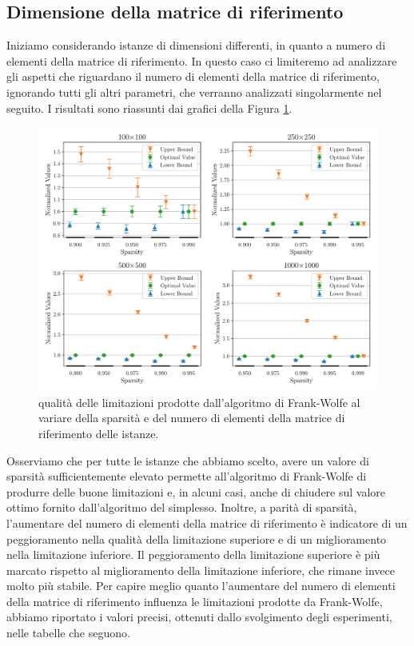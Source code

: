 \subsection{Dimensione della matrice di riferimento}
Iniziamo considerando istanze di dimensioni differenti, in quanto a numero di elementi della matrice di riferimento. In
questo caso ci limiteremo ad analizzare gli aspetti che riguardano il numero di elementi della matrice di riferimento,
ignorando tutti gli altri parametri, che verranno analizzati singolarmente nel seguito. I risultati sono riassunti dai
grafici della Figura \ref{fig:bysize}.
\begin{figure}[ht]
    \centering
    \includegraphics[width=\textwidth]{assets/figures/size.pdf}
    \caption{qualità delle limitazioni prodotte dall'algoritmo di Frank-Wolfe al variare della sparsità e del numero di elementi della
    matrice di riferimento delle istanze.}
    \label{fig:bysize}
\end{figure}

\noindent
Osserviamo che per tutte le istanze che abbiamo scelto, avere un valore di sparsità sufficientemente elevato permette
all'algoritmo di Frank-Wolfe di produrre delle buone limitazioni e, in alcuni casi, anche di chiudere sul valore ottimo
fornito dall'algoritmo del simplesso.
Inoltre, a parità di sparsità, l'aumentare del numero di elementi della matrice di riferimento è indicatore di
un peggioramento nella qualità della limitazione superiore e di un miglioramento nella limitazione inferiore. Il
peggioramento della limitazione superiore è più marcato rispetto al miglioramento della limitazione inferiore, che
rimane invece molto più stabile. Per capire meglio quanto l'aumentare del numero di elementi della matrice di
riferimento influenza le limitazioni prodotte da Frank-Wolfe, abbiamo riportato i valori precisi, ottenuti dallo
svolgimento degli esperimenti, nelle tabelle che seguono.

